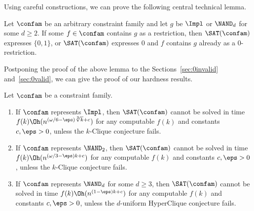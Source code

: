   Using careful constructions, we can prove the following central technical lemma.
%
\begin{lem}\label{lem:representingconstants}
Let $\confam$ be an arbitrary constraint family and let $g$ be $\Impl$ or $\NAND_d$ for some $d\ge 2$. If some $f\in \confam$ contains $g$ as a restriction, then $\SAT(\confam)$ expresses $\{0,1\}$, or $\SAT(\confam)$ expresses $0$ and $f$ contains $g$ already as a $0$-restriction.
\end{lem}
%
Postponing the proof of the above lemma to the Sections~\ref{sec:0invalid} and~\ref{sec:0valid}, we can give the proof of our hardness results.
%
\begin{thm}
Let $\confam$ be a constraint family.
\begin{enumerate}
\item If $\confam$ represents $\Impl$, then $\SAT(\confam)$ cannot be solved in time $f(k)\Oh(n^{(\omega/6-\eps)\sqrt[3]{k}+c})$ for any computable $f(k)$ and constants $c, \eps > 0$, unless the $k$-Clique conjecture fails.
\item If $\confam$ represents $\NAND_{2}$, then $\SAT(\confam)$ cannot be solved in time $f(k)\Oh(n^{(\omega/3-\eps)k+c})$ for any computable $f(k)$ and constants $c, \eps > 0$, unless the $k$-Clique conjecture fails. 
\item If $\confam$ represents $\NAND_{d}$ for some $d\ge 3$, then $\SAT(\confam)$ cannot be solved in time $f(k)\Oh(n^{(1-\eps)k+c})$ for any computable $f(k)$ and constants $c, \eps > 0$, unless the $d$-uniform HyperClique conjecture fails. 
\end{enumerate}
\end{thm}
